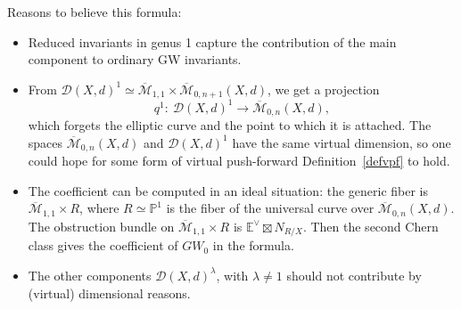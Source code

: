 \documentclass[pdftex]{sigma}
\numberwithin{equation}{section}
\newcommand{\MM}[4]{\overline{\mathcal M}_{#1,#2}(#3,#4)}
\theoremstyle{plain}
\theoremstyle{definition}
\theoremstyle{remark}
\begin{document}
Reasons to believe this formula:
\begin{itemize}\itemsep=0pt
 \item Reduced invariants in genus 1 capture the contribution of the main component to ordinary GW invariants.
 \item From $\mathcal{D}(X,d)^1\simeq \overline{\mathcal M}_{1,1}\times\MM{0}{n+1}{X}{d}$, we get a projection
 \[q^1\colon \ \mathcal{D}(X,d)^1\to \MM{0}{n}{X}{d},
 \]
 which forgets the elliptic curve and the point to which it is attached. The spaces $\MM{0}{n}{X}{d}$ and $\mathcal{D}(X,d)^1$ have the same virtual dimension, so one could hope for some form of virtual push-forward Definition~\ref{defvpf} to hold.

 \item The coefficient can be computed in an ideal situation: the generic fiber is $\overline{\mathcal M}_{1,1}\times R$, where $R\simeq\mathbb P^1$ is the fiber of the universal curve over $\MM{0}{n}{X}{d}$. The obstruction bundle on $\overline{\mathcal M}_{1,1}\times R$ is $\mathbb E^\vee\boxtimes N_{R/X}$. Then the second Chern class gives the coefficient of $GW_0$ in the formula.
 \item The other components $\mathcal{D}(X,d)^{\lambda}$, with $\lambda\neq 1$ should not contribute by (virtual) dimensional reasons.
 \end{itemize}
\end{document}
